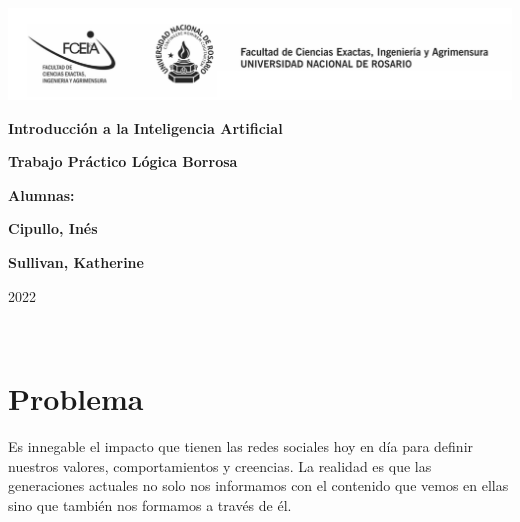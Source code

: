 \documentclass{article}
\begin{document}
\begin{titlepage}
    \hspace{-2.5cm}\includegraphics[scale= 0.48]{header.png}
    \begin{center}
        \vfill
            \noindent\textbf{\Huge Introducción a la Inteligencia Artificial}\par
            \vspace{.5cm}
            \noindent\textbf{\Huge Trabajo Práctico Lógica Borrosa}\par
            \vspace{.5cm}
        \vfill
        \noindent \textbf{\huge Alumnas:}\par
        \vspace{.5cm}
        \noindent \textbf{\Large Cipullo, Inés}\par
        \noindent \textbf{\Large Sullivan, Katherine}\par
 
        \vfill
        \noindent\large 2022
    \end{center}
\end{titlepage}
\ 








\section{Problema}

Es innegable el impacto que tienen las redes sociales hoy en día para definir nuestros valores, 
comportamientos y creencias. La realidad es que las generaciones actuales no solo nos informamos
con el contenido que vemos en ellas sino que también nos formamos a través de él.
\end{document}
